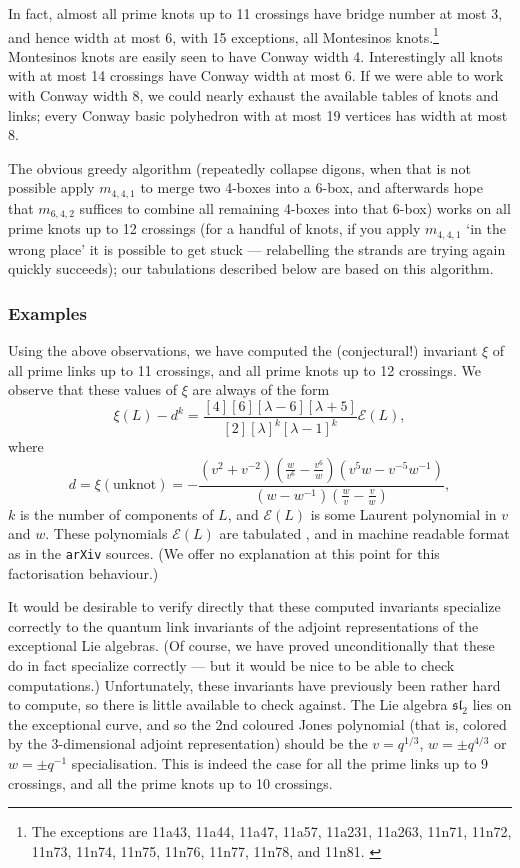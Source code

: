 \documentclass[12pt]{amsart}
\begin{document}
In fact, almost all prime knots up to 11 crossings have bridge number 
at most 3, and hence width at most 6, with 15 exceptions, all Montesinos
knots.\footnote{The exceptions are 11a43, 11a44, 11a47, 11a57, 11a231,
  11a263, 11n71, 11n72, 11n73, 11n74, 11n75, 11n76, 11n77, 11n78, and
  11n81. \cite{1208.4233}}
Montesinos knots are easily seen to have Conway width 4.
Interestingly all knots with at most 14 crossings have Conway width at most 6.
If we were able to work with Conway width 8, we could nearly exhaust the 
available tables of knots and links; every Conway basic polyhedron with at 
most 19 vertices has width at most 8.

The obvious greedy algorithm (repeatedly collapse digons, when that is not
possible apply $m_{4,4,1}$ to merge two 4-boxes into a 6-box, and afterwards
hope that $m_{6,4,2}$  suffices to combine all remaining 4-boxes into that
6-box) works on all prime knots up to 12 crossings (for a handful of knots,
if you apply $m_{4,4,1}$ `in the wrong place' it is possible to get stuck ---
relabelling the strands are trying again quickly succeeds);
our tabulations described below are based on this algorithm.

\subsubsection{Examples}
Using the above observations, we have computed the (conjectural!) 
invariant $\xi$ of all prime links up to 11 crossings, and all prime knots up
to 12 crossings. We observe that these values of $\xi$ are always of the form
$$\xi(L) - d^{k} = 
\frac{[4][6][\lambda-6][\lambda+5]}{[2][\lambda]^k [\lambda-1]^k} \mathcal E(L),$$
where 
$$d = \xi(\textrm{unknot}) = 
-\frac{\left(v^2+v^{-2}\right) \left(\frac{w}{v^6}-\frac{v^6}{w}\right) \left(v^5 w-v^{-5} w^{-1}\right)}{\left(w-w^{-1}\right)
   \left(\frac{w}{v}-\frac{v}{w}\right)},$$ $k$ is the number of components of $L$, 
and $\mathcal E(L)$ is some Laurent polynomial
in $v$ and $w$. These polynomials $\mathcal E (L)$ are tabulated
, and in machine readable format as  in the {\tt arXiv} sources.
(We offer no explanation at this point for this factorisation behaviour.)


It would be desirable to verify directly that these computed invariants specialize 
correctly to the quantum link invariants of the adjoint representations of the
exceptional Lie algebras. (Of course, we have proved unconditionally 
that these do in fact
specialize correctly --- but it would be nice to be able to check computations.)
Unfortunately, these invariants have previously been
rather hard to compute, so there is little available to check against. The Lie
algebra $\mathfrak{sl}_2$ lies on the exceptional curve, and so the 2nd
coloured Jones polynomial  (that is, colored by the 3-dimensional adjoint
representation) should be the $v=q^{1/3}$, $w=\pm q^{4/3}$ or $w=\pm q^{-1}$ specialisation. This is
indeed the case for all the prime links up to 9 crossings, and all the prime knots up to 10 crossings. 
\end{document}
